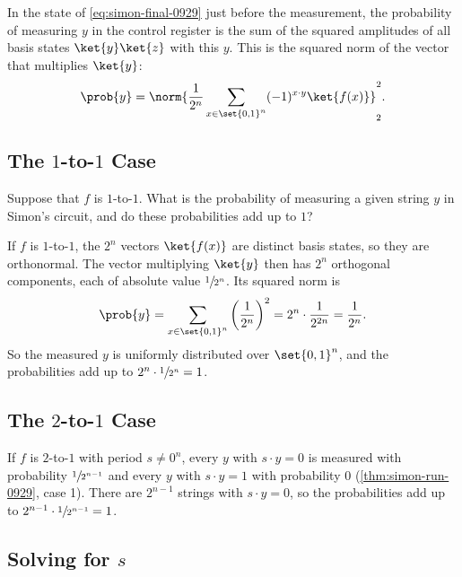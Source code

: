 In the state of \cref{eq:simon-final-0929} just before the measurement, the probability of measuring
$y$ in the control register is the sum of the squared amplitudes of all basis states
$\ket{y}\ket{z}$ with this $y$. This is the squared norm of the vector that multiplies $\ket{y}$:
\[\prob{y} = \norm{\frac{1}{2^n} \sum_{x \in \set{0,1}^n} (-1)^{x \cdot y} \ket{f(x)}}_2^2.\]

\subsection{The \texorpdfstring{$1$}{1}-to-\texorpdfstring{$1$}{1} Case}

\begin{exercisebox}
\begin{exercise}\label{ex:simon-11-1001}
    Suppose that $f$ is $1$-to-$1$. What is the probability of measuring a given string $y$ in Simon's
    circuit, and do these probabilities add up to $1$?
\end{exercise}
\tcblower
\begin{wsolution}
    If $f$ is $1$-to-$1$, the $2^n$ vectors $\ket{f(x)}$ are distinct basis states, so they are
    orthonormal. The vector multiplying $\ket{y}$ then has $2^n$ orthogonal components, each of
    absolute value $\sfrac{1}{2^n}$. Its squared norm is
    \[\prob{y} = \sum_{x \in \set{0,1}^n} \left(\frac{1}{2^n}\right)^2 = 2^n \cdot \frac{1}{2^{2n}} = \frac{1}{2^n}.\]
    So the measured $y$ is uniformly distributed over $\set{0,1}^n$, and the probabilities add up to
    $2^n \cdot \sfrac{1}{2^n} = 1$.
\end{wsolution}
\end{exercisebox}

\subsection{The \texorpdfstring{$2$}{2}-to-\texorpdfstring{$1$}{1} Case}

If $f$ is $2$-to-$1$ with period $s \neq 0^n$, every $y$ with $s \cdot y = 0$ is measured with
probability $\sfrac{1}{2^{n-1}}$ and every $y$ with $s \cdot y = 1$ with probability $0$
(\cref{thm:simon-run-0929}, case 1). There are $2^{n-1}$ strings with $s \cdot y = 0$, so the
probabilities add up to $2^{n-1} \cdot \sfrac{1}{2^{n-1}} = 1$.

\subsection{Solving for \texorpdfstring{$s$}{s}}

